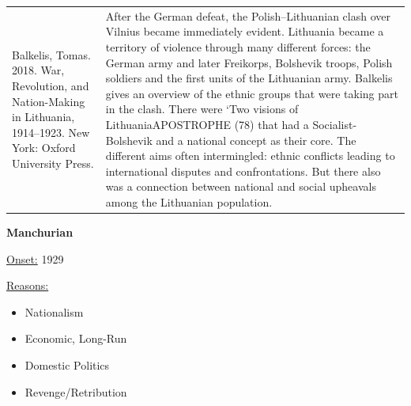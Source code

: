 {\begin{longtable}{p{}p{}}
\\
Balkelis, Tomas. 2018. War, Revolution, and Nation-Making in Lithuania, 1914–1923. New York: Oxford University Press. & After the German defeat, the Polish–Lithuanian clash over Vilnius became immediately evident. Lithuania became a territory of violence through many different forces: the German army and later Freikorps, Bolshevik troops, Polish soldiers and the first units of the Lithuanian army. Balkelis gives an overview of the ethnic groups that were taking part in the clash. There were ‘Two visions of LithuaniaAPOSTROPHE (78) that had a Socialist-Bolshevik and a national concept as their core. The different aims often intermingled: ethnic conflicts leading to international disputes and confrontations. But there also was a connection between national and social upheavals among the Lithuanian population.
\\
\end{longtable}}
\clearpage
         \textbf{Manchurian} 

          \underline{Onset:} 1929         

\underline{Reasons:}
\begin{itemize}
\item Nationalism
\item Economic, Long-Run
\item Domestic Politics
\item Revenge/Retribution
\end{itemize}

